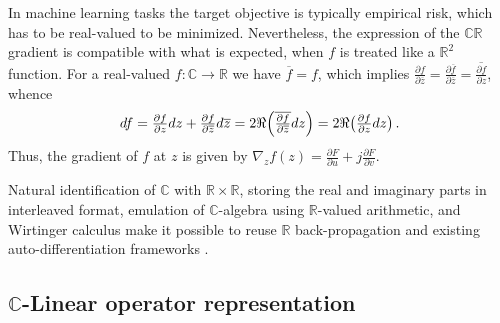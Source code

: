 \documentclass[a4paper,10pt]{article}
\newcommand{\real}{\mathbb{R}}
\newcommand{\cplx}{\mathbb{C}}
\newcommand{\conj}[1]{\overline{#1}}
\begin{document}

In machine learning tasks the target objective is typically empirical risk, which has to
be real-valued to be minimized. Nevertheless, the expression of the $\cplx\real$ gradient
is compatible with what is expected, when $f$ is treated like a $\real^2$ function. For a
real-valued $f\colon \cplx \to \real$ we have $\conj{f} = f$, which implies $
  \tfrac{\partial f}{\partial \conj{z}}
    = \tfrac{\partial \conj{f}}{\partial \conj{z}}
    = \conj{\tfrac{\partial f}{\partial z}}
$, whence
$$
df
  = \tfrac{\partial f}{\partial z} dz
    + \tfrac{\partial f}{\partial \conj{z}} d\conj{z}
  = 2 \Re \Bigl(
    \conj{\tfrac{\partial f}{\partial \conj{z}}} dz
  \Bigr)
  = 2 \Re \bigl(
    \tfrac{\partial f}{\partial z} dz
  \bigr)
  \,. $$
Thus, the gradient of $f$ at $z$ is given by $
  \nabla_z f(z)
    = \tfrac{\partial F}{\partial u}
      + j \tfrac{\partial F}{\partial v}
$.

Natural identification of $\cplx$ with $\real\times \real$, storing the real and imaginary
parts in interleaved format, emulation of $\cplx$-algebra using $\real$-valued arithmetic,
and Wirtinger calculus make it possible to reuse $\real$ back-propagation and existing
auto-differentiation frameworks \citep{trabelsi_deep_2017}.


\subsection{$\cplx$-Linear operator representation} %
\label{sub:c-linear_operator_representation}
\end{document}
